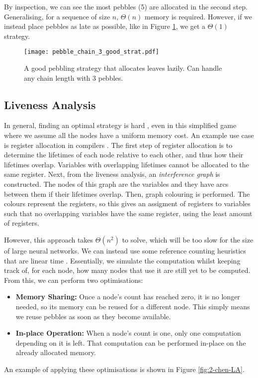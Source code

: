By inspection, we can see the most pebbles (5) are allocated in the second step.
Generalising, for a sequence of size \(n\), \(\Theta(n)\) memory is required.
However, if we instead place pebbles as late as possible, like in Figure \ref{fig:2-pebble-chain-good}, we get a \(\Theta(1)\) strategy.

\begin{figure}[hp]
    \centering
    \texttt{[image: pebble\_chain\_3\_good\_strat.pdf]}
    \caption{A good pebbling strategy that allocates leaves lazily. Can handle any chain length with 3 pebbles.}
    \label{fig:2-pebble-chain-good}
\end{figure}

\subsection{Liveness Analysis}
In general, finding an optimal strategy is hard \cite{Austrin2011}, even in this simplified game where we assume all the nodes have a uniform memory cost.
An example use case is register allocation in compilers \cite{Chaitin1982}.
The first step of register allocation is to determine the lifetimes of each node relative to each other, and thus how their lifetimes overlap.
Variables with overlapping lifetimes cannot be allocated to the same register.
Next, from the liveness analysis, an \textit{interference graph} is constructed.
The nodes of this graph are the variables and they have arcs between them if their lifetimes overlap.
Then, graph colouring is performed.
The colours represent the registers, so this gives an assigment of registers to variables such that no overlapping variables have the same register, using the least amount of registers.

However, this approach takes \(\Theta(n^2)\) to solve, which will be too slow for the size of large neural networks.
We can instead use some reference counting heuristics that are linear time \cite{Chen2016}.
Essentially, we simulate the computation whilst keeping track of, for each node, how many nodes that use it are still yet to be computed. From this, we can perform two optimisations:
\begin{itemize}[topsep=0.1em]
    \item \textbf{Memory Sharing:} Once a node's count has reached zero, it is no longer needed, so its memory can be reused for a different node.
    This simply means we reuse pebbles as soon as they become available.
    \item \textbf{In-place Operation:} When a node's count is one, only one computation depending on it is left.
    That computation can be performed in-place on the already allocated memory.
\end{itemize}
An example of applying these optimisations is shown in Figure \ref{fig:2-chen-LA}. 


